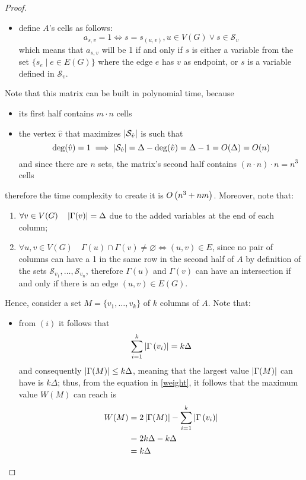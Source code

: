 \begin{proof}
\begin{itemize}
        \item define $A$'s cells as follows: $$a_{s, v} = 1 \iff s = s_{(u, v)}, u \in V(G) \lor s \in \mathcal S_v$$ which means that $a_{s, v}$ will be 1 if and only if $s$ is either a variable from the set $\{s_e \mid e \in E(G)\}$ where the edge $e$ has $v$ as endpoint, or $s$ is a variable defined in $\mathcal S_v$.
    \end{itemize}

    Note that this matrix can be built in polynomial time, because

    \begin{itemize}
        \item its first half contains $m \cdot n$ cells
        \item the vertex $\hat v$ that maximizes $\left|\mathcal S_{\hat v}\right|$ is such that $$\deg(\hat v) = 1 \implies \left|\mathcal S_{\hat v}\right| = \Delta - \deg(\hat v) = \Delta - 1 = O(\Delta) = O(n)$$ and since there are $n$ sets, the matrix's second half contains $(n \cdot n) \cdot n = n^3$ cells
    \end{itemize}

    therefore the time complexity to create it is $O \left(n^3 + nm\right)$. Moreover, note that:

    \begin{enumerate}[label=\roman*), font=\itshape]
        \item $\forall v \in V(G) \quad \left|\Gamma(v)\right| = \Delta$ due to the added variables at the end of each column;
        \item $\forall u, v \in V(G) \quad \Gamma(u) \cap \Gamma(v) \neq \varnothing \iff (u, v) \in E$, since no pair of columns can have a 1 in the same row in the second half of $A$ by definition of the sets $\mathcal S_{v_1}, \ldots , \mathcal S_{v_n}$, therefore $\Gamma(u)$ and $\Gamma(v)$ can have an intersection if and only if there is an edge $(u, v) \in E(G)$.
    \end{enumerate}

    Hence, consider a set $M = \{v_1, \ldots, v_k\}$ of $k$ columns of $A$. Note that:

    \begin{itemize}
        \item from $(i)$ it follows that $$\sum_{i = 1}^k {\left|\Gamma \left(v_i\right)\right|} = k \Delta$$ and consequently $\left|\Gamma(M)\right| \le k \Delta$, meaning that the largest value $\left|\Gamma(M)\right|$ can have is $k \Delta$; thus, from the equation in \cref{weight}, it follows that the maximum value $W(M)$ can reach is
            \begin{equation*}
                \begin{split}
                    W(M) & = 2 \left|\Gamma(M)\right| - \sum_{i = 1}^k{\left|\Gamma \left(v_i\right)\right|} \\
                         & = 2 k \Delta - k \Delta \\
                         & = k \Delta
                \end{split}
            \end{equation*}


\end{itemize}
\end{proof}
